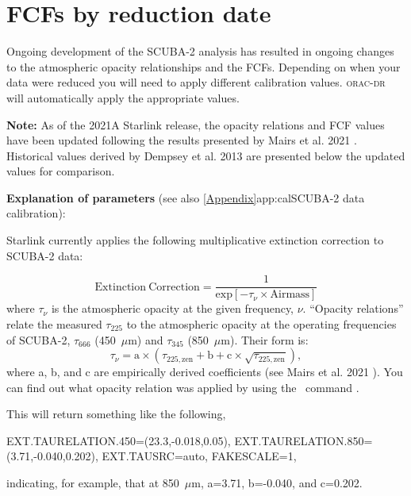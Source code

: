 \chapter{FCFs by reduction date}
\label{app:fcfs}

Ongoing development of the SCUBA-2 analysis has resulted in ongoing
changes to the atmospheric opacity relationships and the FCFs. 
Depending on when your data were reduced you will need to apply 
different calibration values. \textsc{orac-dr} will automatically apply
the appropriate values. 

\textbf{Note:} As of the 2021A Starlink release, the
opacity relations and FCF values have been updated following the
results presented by Mairs et al. 2021 \cite{mairs21}. Historical values derived by Dempsey et al. 2013
\cite{dempsey12} are presented below the updated values for comparison.

\vspace{1cm}

\textbf{Explanation of parameters} (see also \cref{Appendix}{app:cal}{SCUBA-2 data calibration}):

Starlink currently applies the following multiplicative extinction correction to SCUBA-2 data:

\begin{equation}
\mathrm{Extinction\:Correction} = \frac{1}{\mathrm{exp}[-\tau_{\nu}\times\mathrm{Airmass}]}
\end{equation}
where $\tau_{\nu}$ is the atmospheric opacity at the given frequency, $\nu$. ``Opacity relations''
relate the measured $\tau_{225}$ to the atmospheric opacity at the operating frequencies of 
SCUBA-2, $\tau_{666}$ (450~$\mu$m) and $\tau_{345}$ (850~$\mu$m). Their form is:
\begin{equation}
\label{eq:2021taurelation}
\tau_{\nu} = \mathrm{a}\times(\tau_{225,\mathrm{zen}} + \mathrm{b} + \mathrm{c}\times\sqrt{\tau_{225,\mathrm{zen}}}),
\end{equation}
where a, b, and c are empirically derived coefficients (see Mairs et al. 2021 \cite{mairs21}).
You can find out what opacity relation was applied by using the \Kappa\ command \hislist.

\begin{terminalv}
\end{terminalv}

This will return something like the following,
\begin{terminalv}
      EXT.TAURELATION.450=(23.3,-0.018,0.05),
      EXT.TAURELATION.850=(3.71,-0.040,0.202), EXT.TAUSRC=auto, FAKESCALE=1,
\end{terminalv}
indicating, for example, that at 850~$\mu$m, a=3.71, b=-0.040, and c=0.202.

